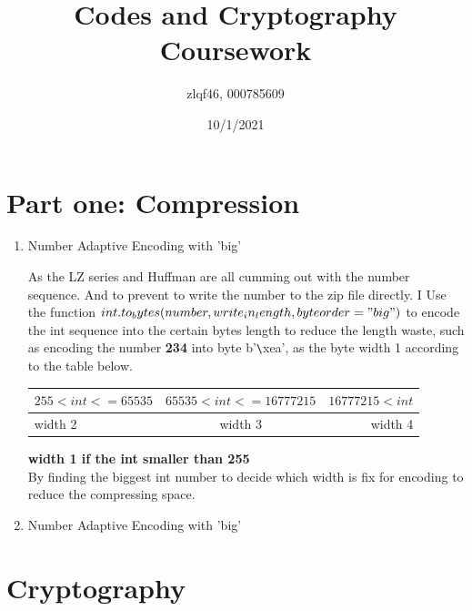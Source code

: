 \documentclass[margin 2cm]{report}
\title{\textbf{Codes and Cryptography Coursework}}
\author{zlqf46, 000785609}
\date{10/1/2021}
\begin{document}
\maketitle
\section[1]{\Large Part one: Compression}
\begin{enumerate}
\normalsize\item[1)]{Number Adaptive Encoding with 'big'}
\begin{spacing}{1.5}
\normalsize\indent\setlength{\parindent}{2em}As the LZ series and Huffman are all cumming out with the number sequence. And to prevent to write the number to the zip file directly. I Use the function $int.to_bytes(number, write_in_length, byteorder="big")$ to encode the int sequence into the certain bytes length to reduce the length waste, such as encoding the number \textbf{234} into byte b'\verb|\|xea', as the byte width 1 according to the table below.
\newline
\newline
\begin{tabular}{|l|c|r|}
\hline
$255<int<=65535$&$65535<int<=16777215$&$16777215<int$\\
\hline
width 2&width 3&width 4\\
\hline
\end{tabular}
\newline\normalsize\textbf{width 1 if the int smaller than 255}\\
By finding the biggest int number to decide which width is fix for encoding to reduce the compressing space.
\end{spacing}

\normalsize\item[1)]{Number Adaptive Encoding with 'big'}
\begin{spacing}{1.5}
\normalsize\indent\setlength{\parindent}{2em}
\end{spacing}
\end{enumerate}


\newpage
\Large\section[2]{Cryptography}
\end{document}
